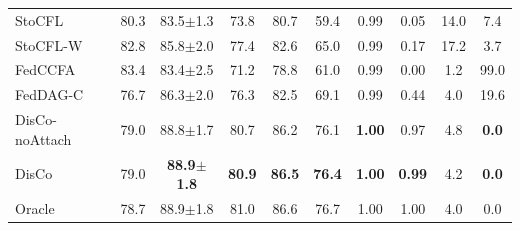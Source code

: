 {\begin{tabular}{lccccccccc}
StoCFL & 80.3 & 83.5$\pm$1.3 & 73.8 & 80.7 & 59.4 & 0.99 & 0.05 & 14.0 & 7.4 \\
StoCFL-W & 82.8 & 85.8$\pm$2.0 & 77.4 & 82.6 & 65.0 & 0.99 & 0.17 & 17.2 & 3.7 \\
FedCCFA & 83.4 & 83.4$\pm$2.5 & 71.2 & 78.8 & 61.0 & 0.99 & 0.00 & 1.2 & 99.0 \\
FedDAG-C & 76.7 & 86.3$\pm$2.0 & 76.3 & 82.5 & 69.1 & 0.99 & 0.44 & 4.0 & 19.6 \\
DisCo-noAttach & 79.0 & 88.8$\pm$1.7 & 80.7 & 86.2 & 76.1 & \textbf{1.00} & 0.97 & 4.8 & \textbf{0.0} \\
DisCo & 79.0 & \textbf{88.9$\pm$1.8} & \textbf{80.9} & \textbf{86.5} & \textbf{76.4} & \textbf{1.00} & \textbf{0.99} & 4.2 & \textbf{0.0} \\
Oracle & 78.7 & 88.9$\pm$1.8 & 81.0 & 86.6 & 76.7 & 1.00 & 1.00 & 4.0 & 0.0 \\
\bottomrule
\end{tabular}}
